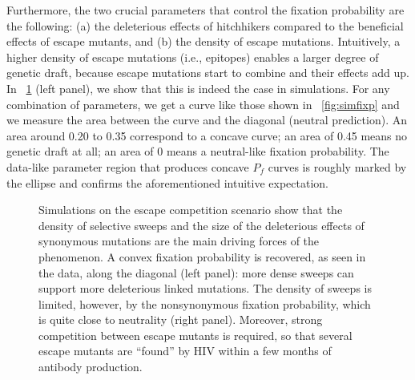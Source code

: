 \documentclass[12pt,a4paper,notitlepage,onecolumn]{article}
\begin{document}
Furthermore, the two crucial parameters that control the fixation probability
are the following: (a) the deleterious effects of hitchhikers compared to
the beneficial effects of escape mutants, and (b) the density of escape
mutations. Intuitively, a higher density of escape mutations (i.e., epitopes)
enables a larger degree of genetic draft, because escape mutations start to
combine and their effects add up. In \figurename~\ref{fig:simheat} (left panel),
we show that this is indeed the case in simulations. For any combination of
parameters, we get a curve like those shown in \figurename~\ref{fig:simfixp} and
we measure the area between the curve and the diagonal (neutral prediction). An
area around 0.20 to 0.35 correspond to a concave curve; an area of 0.45 means no
genetic draft at all; an area of 0 means a neutral-like fixation probability.
The data-like parameter region that produces concave $P_f$ curves is roughly
marked by the ellipse and confirms the aforementioned intuitive expectation.
\begin{figure}
\begin{center}
\caption{Simulations on the escape competition scenario show that the density of
 selective sweeps and the size of the deleterious effects of synonymous
 mutations are the main driving forces of the phenomenon. A convex fixation
 probability is recovered, as seen in the data, along the diagonal (left panel):
 more dense sweeps can support more deleterious linked mutations. The density of
 sweeps is limited, however, by the nonsynonymous fixation probability, which is
 quite close to neutrality (right panel). Moreover, strong competition between
 escape mutants is required, so that several escape mutants are ``found'' by HIV
within a few months of antibody production.}
\label{fig:simheat}
\end{center}
\end{figure}
\end{document}

